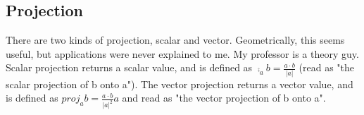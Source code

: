 \subsection{Projection}
There are two kinds of projection, scalar and vector. Geometrically, this seems useful, but applications were never explained to me. My professor is a theory guy. Scalar projection returns a scalar value, and is defined as $\comp_ab = \frac{a \cdot b}{|a|}$ (read as "the scalar projection of b onto a"). The vector projection returns a vector value, and is defined as $proj_ab = \frac{a \cdot b}{|a|^2} a$ and read as "the vector projection of b onto a".
